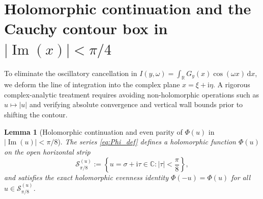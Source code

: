 \documentclass[11pt,a4paper,reqno]{amsart}
\newtheorem{lemma}[theorem]{Lemma}
\theoremstyle{definition}
\theoremstyle{remark}
\numberwithin{equation}{section}
\newcommand{\dd}{\mathrm{d}}
\newcommand{\ii}{\mathrm{i}}
\newcommand{\Ima}{\operatorname{Im}}
\begin{document}
\section{Holomorphic continuation and the Cauchy contour box in \texorpdfstring{$|\Ima(x)| < \pi/4$}{|Im(x)| < pi/4}}\label{sec:cauchy}

To eliminate the oscillatory cancellation in $I(y,\omega) = \int_{\mathbb{R}} G_y(x)\cos(\omega x)\,\dd x$, we deform the line of integration into the complex plane $x = \xi + \ii\eta$. A rigorous complex-analytic treatment requires avoiding non-holomorphic operations such as $u \mapsto |u|$ and verifying absolute convergence and vertical wall bounds prior to shifting the contour.

\begin{lemma}[Holomorphic continuation and even parity of $\Phi(u)$ in $|\Ima(u)| < \pi/8$]\label{lem:parity}
The series \eqref{eq:Phi_def} defines a holomorphic function $\Phi(u)$ on the open horizontal strip
\begin{equation}\label{eq:strip_u}
\mathcal{S}_{\pi/8}^{(u)} := \left\{u = \sigma + \ii\tau \in \mathbb{C} : |\tau| < \frac{\pi}{8}\right\},
\end{equation}
and satisfies the exact holomorphic evenness identity $\Phi(-u) = \Phi(u)$ for all $u \in \mathcal{S}_{\pi/8}^{(u)}$.
\end{lemma}
\end{document}
